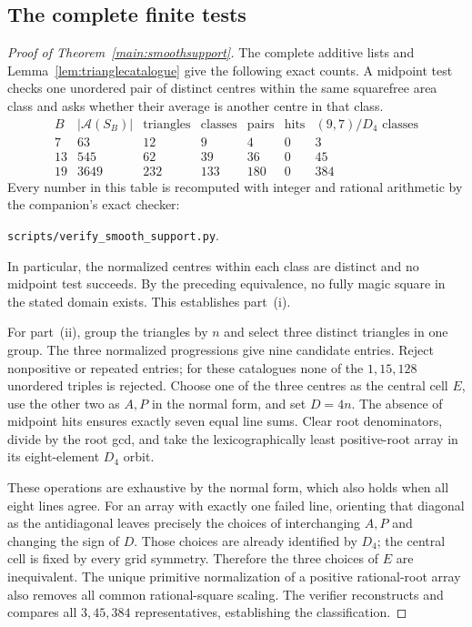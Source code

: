 \subsection{The complete finite tests}

\begin{proof}[Proof of Theorem~\ref{main:smoothsupport}]
The complete additive lists and Lemma~\ref{lem:trianglecatalogue} give the
following exact counts. A midpoint test checks one unordered pair of
distinct centres within the same squarefree area class and asks whether
their average is another centre in that class.
\[
\begin{array}{c|rrrrrr}
B & |\mathcal A(S_B)| & \text{triangles} & \text{classes} &
\text{pairs} & \text{hits} & (9,7)/D_4\text{ classes}\\\hline
7  & 63   & 12  & 9   & 4   & 0 & 3\\
13 & 545  & 62  & 39  & 36  & 0 & 45\\
19 & 3649 & 232 & 133 & 180 & 0 & 384
\end{array}
\]
Every number in this table is recomputed with integer and rational
arithmetic by the companion's exact checker:
\begin{center}\texttt{scripts/verify\_smooth\_support.py}.\end{center}
In particular,
the normalized centres within each class are distinct and no midpoint
test succeeds. By the preceding equivalence, no fully magic square in
the stated domain exists. This establishes part~(i).

For part~(ii), group the triangles by $n$ and select three distinct
triangles in one group. The three normalized progressions give nine
candidate entries. Reject nonpositive or repeated entries; for these
catalogues none of the $1,15,128$ unordered triples is rejected. Choose
one of the three centres as the central cell $E$, use the other two as
$A,P$ in the normal form, and set $D=4n$. The absence of midpoint hits
ensures exactly seven equal line sums. Clear root denominators, divide
by the root gcd, and take the lexicographically least positive-root array
in its eight-element $D_4$ orbit.

These operations are exhaustive by the normal form, which also holds
when all eight lines agree. For an array with exactly one failed line,
orienting that diagonal as the antidiagonal leaves precisely the choices
of interchanging $A,P$ and changing the sign of $D$. Those choices are
already identified by $D_4$; the central cell is fixed by every grid
symmetry. Therefore the three choices of $E$ are inequivalent. The unique
primitive normalization of a positive rational-root array also removes
all common rational-square scaling. The verifier reconstructs and compares
all $3,45,384$ representatives, establishing the classification.


\end{proof}
